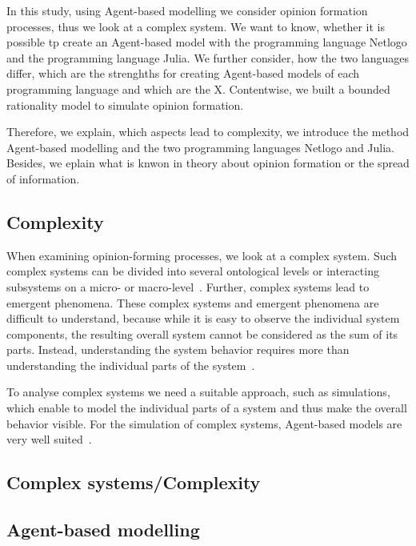 \documentclass[runningheads]{llncs}
\begin{document}
In this study, using Agent-based modelling we consider opinion formation
processes, thus we look at a complex system. We want to know, whether it
is possible tp create an Agent-based model with the programming language
Netlogo and the programming language Julia. We further consider, how the
two languages differ, which are the strenghths for creating Agent-based
models of each programming language and which are the X. Contentwise, we
built a bounded rationality model to simulate opinion formation.

Therefore, we explain, which aspects lead to complexity, we introduce
the method Agent-based modelling and the two programming languages
Netlogo and Julia. Besides, we eplain what is knwon in theory about
opinion formation or the spread of information.

\hypertarget{complexity}{%
\subsection{Complexity}\label{complexity}}

When examining opinion-forming processes, we look at a complex system.
Such complex systems can be divided into several ontological levels or
interacting subsystems on a micro- or macro-level~\autocite{Conte2012}.
Further, complex systems lead to emergent phenomena. These complex
systems and emergent phenomena are difficult to understand, because
while it is easy to observe the individual system components, the
resulting overall system cannot be considered as the sum of its parts.
Instead, understanding the system behavior requires more than
understanding the individual parts of the
system~\autocite{Valdez2018human}.

To analyse complex systems we need a suitable approach, such as
simulations, which enable to model the individual parts of a system and
thus make the overall behavior visible. For the simulation of complex
systems, Agent-based models are very well suited~\autocite{Epstein2007}.

\hypertarget{complex-systemscomplexity}{%
\subsection{Complex
systems/Complexity}\label{complex-systemscomplexity}}

\hypertarget{agent-based-modelling}{%
\subsection{Agent-based modelling}\label{agent-based-modelling}}
\end{document}
